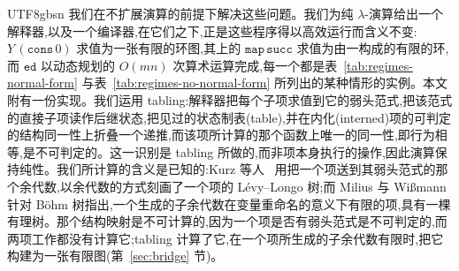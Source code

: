 \begin{CJK*}{UTF8}{gbsn}
  \ifPaperChinese
  我们在不扩展演算的前提下解决这些问题。我们为纯 $\lambda$-演算给出一个解释器,以及一个编译器,在它们之下,正是这些程序得以高效运行而含义不变:$Y\,(\mathtt{cons}\,0)$ 求值为一张有限的环图,其上的 $\mathtt{map}\,\mathtt{succ}$ 求值为由一构成的有限的环,而 $\mathtt{ed}$ 以动态规划的 $O(mn)$ 次算术运算完成,每一个都是表~\ref{tab:regimes-normal-form} 与表~\ref{tab:regimes-no-normal-form} 所列出的某种情形的实例。本文附有一份实现。我们运用 tabling:解释器把每个子项求值到它的弱头范式,把该范式的直接子项读作后继状态,把见过的状态制表(table),并在内化(interned)项的可判定的结构同一性上折叠一个递推,而该项所计算的那个函数上唯一的同一性,即行为相等,是不可判定的。这一识别是 tabling 所做的,而非项本身执行的操作,因此演算保持纯性。我们所计算的含义是已知的:Kurz 等人~\cite{kurz2013-nominal-coalgebraic-data-types} 用把一个项送到其弱头范式的那个余代数,以余代数的方式刻画了一个项的 Lévy--Longo 树;而 Milius 与 Wi{\ss}mann~\cite{milius2015-finitary-corecursion} 针对 Böhm 树指出,一个生成的子余代数在变量重命名的意义下有限的项,具有一棵有理树。那个结构映射是不可计算的,因为一个项是否有弱头范式是不可判定的,而两项工作都没有计算它;tabling 计算了它,在一个项所生成的子余代数有限时,把它构建为一张有限图(第~\ref{sec:bridge} 节)。
  \else

\end{CJK*}
